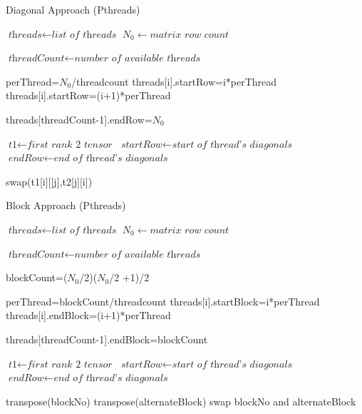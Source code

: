 \documentclass[journal,10pt]{IEEEtran}
\begin{document}
\begin{algorithm}
\caption{Diagonal Approach (Pthreads)}\label{euclid}
\begin{algorithmic}[1]


\State $\textit{threads} \gets \textit{list of threads}$
\State ${N_0} \gets \textit{matrix row count}$

\State $\textit{threadCount} \gets \textit{number of available threads}$


perThread=$N_0$/threadcount
 \State   threads[i].startRow=i*perThread
  \State  threads[i].startRow=(i+1)*perThread
\EndFor

threads[threadCount-1].endRow=$N_0$

\EndProcedure



\State $\textit{t1} \gets \textit{first rank 2 tensor}$
\State $\textit{startRow} \gets \textit{start of thread's diagonals}$
\State $\textit{endRow} \gets \textit{end of thread's diagonals}$

\State swap(t1[i][[j],t2[j][i])
\EndFor
\EndFor



\EndProcedure
\end{algorithmic}
\end{algorithm}



\begin{algorithm}
\caption{Block Approach (Pthreads)}\label{euclid}
\begin{algorithmic}[1]


\State $\textit{threads} \gets \textit{list of threads}$
\State ${N_0} \gets \textit{matrix row count}$

\State $\textit{threadCount} \gets \textit{number of available threads}$

blockCount=($N_0$/2)($N_0$/2 +1)/2

perThread=blockCount/threadcount
 \State   threads[i].startBlock=i*perThread
  \State  threads[i].endBlock=(i+1)*perThread
\EndFor

threads[threadCount-1].endBlock=blockCount

\EndProcedure



\State $\textit{t1} \gets \textit{first rank 2 tensor}$
\State $\textit{startRow} \gets \textit{start of thread's diagonals}$
\State $\textit{endRow} \gets \textit{end of thread's diagonals}$

\State transpose(blockNo)
\State transpose(alternateBlock)
\State swap blockNo and alternateBlock
\EndFor




\EndProcedure
\end{algorithmic}
\end{algorithm}
\end{document}
